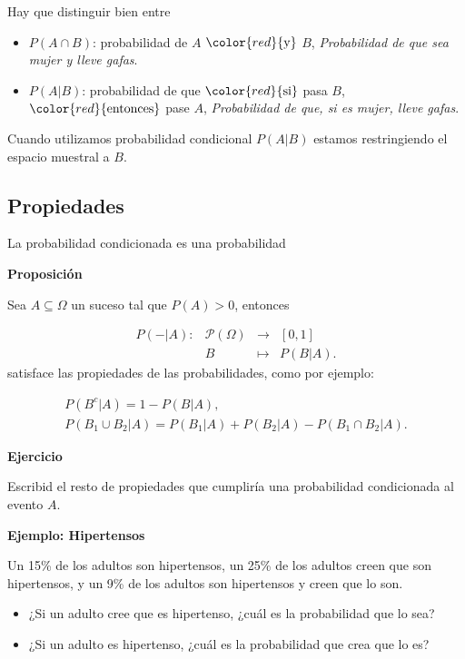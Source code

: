 \documentclass[]{book}
\providecommand{\tightlist}{%
  \setlength{\itemsep}{0pt}\setlength{\parskip}{0pt}}
\begin{document}
Hay que distinguir bien entre

\begin{itemize}
\item
  \(P(A\cap B)\): probabilidad de \(A\) \(\color{red}{\text{y}}\) \(B\), \emph{Probabilidad de que sea mujer y lleve gafas}.
\item
  \(P(A|B)\): probabilidad de que \(\color{red}{\text{si}}\) pasa \(B\), \(\color{red}{\text{entonces}}\) pase \(A\), \emph{Probabilidad de que, si es mujer, lleve gafas}.
\end{itemize}

Cuando utilizamos probabilidad condicional \(P(A|B)\) estamos restringiendo el espacio muestral a \(B\).

\hypertarget{propiedades-2}{%
\subsection{Propiedades}\label{propiedades-2}}

La probabilidad condicionada es una probabilidad

\textbf{Proposición}

Sea \(A\subseteq \Omega\) un suceso tal que \(P(A)>0\), entonces

\[
\begin{array}{rccl}
P(-|A):& \mathcal{P}(\Omega) & \to & [0,1]\\
&B & \mapsto & P(B|A).
\end{array}
\]
satisface las propiedades de las probabilidades, como por ejemplo:

\[
\begin{array}{l}
P(B^c|A)=1-P(B|A),\\
P(B_1\cup B_2|A)=P(B_1|A)+P(B_2|A)-P(B_1\cap B_2|A).
\end{array}
\]

\textbf{Ejercicio}

Escribid el resto de propiedades que cumpliría una probabilidad condicionada al evento \(A\).

\textbf{Ejemplo: Hipertensos}

Un 15\% de los adultos son hipertensos, un 25\% de los adultos creen que son hipertensos, y un 9\% de los adultos son hipertensos y creen que lo son.

\begin{itemize}
\tightlist
\item
  ¿Si un adulto cree que es hipertenso, ¿cuál es la probabilidad que lo sea?
\item
  ¿Si un adulto es hipertenso, ¿cuál es la probabilidad que crea que lo es?
\end{itemize}
\end{document}
